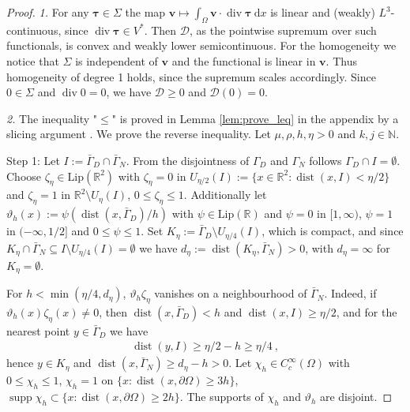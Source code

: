 \documentclass{article}
\theoremstyle{definition}
\newcommand{\bfv}{\boldsymbol{v}}
\newcommand{\bftau}{\boldsymbol{\tau}}
\newcommand{\D}{\mathcal{D}}
\newcommand{\dd}{\:\mathrm{d}}
\renewcommand\div{\operatorname{\mathrm{div}}}
\DeclareMathOperator{\dist}{dist}
\DeclareMathOperator{\supp}{supp}
\begin{document}
\begin{proof}
    \textit{1.}
    For any $\bftau \in \Sigma$ the map $\bfv \mapsto \int_\Omega \bfv \cdot \div \bftau \dd x$ is linear and (weakly) $L^3$-continuous, since $\div\bftau\in V^*$. Then $\D$, as the pointwise
    supremum over such functionals, is convex and weakly lower semicontinuous. For the homogeneity we notice that
    $\Sigma$ is independent of $\bfv$ and the functional is linear in $\bfv$. Thus homogeneity of degree 1 holds, since
    the supremum scales accordingly. Since $0 \in \Sigma$ and $\div 0 =0$, we have $\D \geq 0$ and $\D (0) =0$.

    \textit{2.}
    The inequality "$\leq$" is proved in Lemma \ref{lem:prove_leq} in the appendix
    by a slicing argument \cite{A83}. We prove the reverse inequality.
    Let $\mu, \rho, h, \eta >0$ and $k,j \in \mathbb N$.

    Step 1: Let $I := \bar \Gamma_D \cap \bar \Gamma_N$. From the disjointness of $\Gamma_D$ and $\Gamma_N$
    follows $\Gamma_D \cap I = \emptyset$. Choose $\zeta_\eta \in \mathrm{Lip}(\mathbb R^2)$ with
    $\zeta_\eta=0$ in $U_{\eta/2}(I):=\{x\in \mathbb R^2 :\dist(x,I)<\eta/2\}$ and $\zeta_\eta =1$
    in $\mathbb R^2 \setminus U_{\eta}(I)$, $0\leq \zeta_\eta \leq 1$. Additionally let
    $\vartheta_h(x):= \psi (\dist(x,\bar\Gamma_D)/h)$ with $\psi \in \mathrm{Lip}(\mathbb R)$ and
    $\psi = 0$ in $[1,\infty)$, $\psi =1$  in $(-\infty,1/2]$ and $0\leq \psi \leq 1$.
    Set $K_\eta := \bar\Gamma_D \setminus U_{\eta/4}(I)$, which is compact, and
    since $K_\eta \cap \bar\Gamma_N \subseteq I \setminus U_{\eta/4}(I) = \emptyset$ we have
    $d_\eta := \dist(K_\eta,\bar\Gamma_N)>0$, with $d_\eta = \infty$ for $K_\eta = \emptyset$.

    For $h<\min (\eta/4,d_\eta)$, $\vartheta_h\zeta_\eta$ vanishes on a neighbourhood of $\bar\Gamma_N$.
    Indeed, if $\vartheta_h(x)\zeta_\eta(x) \neq 0$, then $\dist(x,\bar\Gamma_D)<h$ and $\dist(x,I)\geq \eta/2$,
    and for the nearest point $y\in \bar\Gamma_D$ we have
    \begin{align*}
        \dist(y,I) \geq \eta/2 - h \geq \eta/4 \ ,
    \end{align*}
    hence $y\in K_\eta$ and $\dist(x,\bar\Gamma_N) \geq d_\eta-h >0$.
    Let $\chi_h \in C^\infty_c(\Omega)$ with $0\leq \chi_h\leq 1$, $\chi_h =1$ on $\{x:\dist(x,\partial\Omega)\geq 3h\}$,
    $\supp \chi_h \subset \{x : \dist(x,\partial\Omega)\geq 2h \} $.
    The supports of $\chi_h$ and $\vartheta_h$ are disjoint.


\end{proof}
\end{document}

